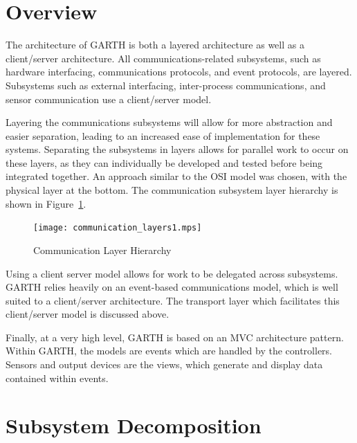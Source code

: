 \documentclass{report}
\begin{document}
\section{Overview}
\label{sec:architecture_overview}

The architecture of GARTH is both a layered architecture as well as a
client/server architecture. All communications-related subsystems, such as
hardware interfacing, communications protocols, and event protocols, are
layered. Subsystems such as external interfacing, inter-process communications,
and sensor communication use a client/server model.

Layering the communications subsystems will allow for more abstraction and
easier separation, leading to an increased ease of implementation for these
systems. Separating the subsystems in layers allows for parallel work to occur
on these layers, as they can individually be developed and tested before being
integrated together. An approach similar to the OSI model was chosen, with the
physical layer at the bottom. The communication subsystem layer hierarchy is
shown in Figure~\ref{fig:communication_layers}.

\begin{figure}[hp]
    \centering
        \caption{Communication Layer Hierarchy}
        \scriptsize
        \setlength{\unitlength}{2.0em}
        \texttt{[image: communication\_layers1.mps]}
        \normalsize
    \label{fig:communication_layers}
\end{figure}

Using a client server model allows for work to be delegated across
subsystems. GARTH relies heavily on an event-based communications model, which
is well suited to a client/server architecture. The transport layer which
facilitates this client/server model is discussed above.

Finally, at a very high level, GARTH is based on an MVC architecture pattern.
Within GARTH, the models are events which are handled by the controllers. Sensors
and output devices are the views, which generate and display data contained within
events.

\section{Subsystem Decomposition}

\end{document}
